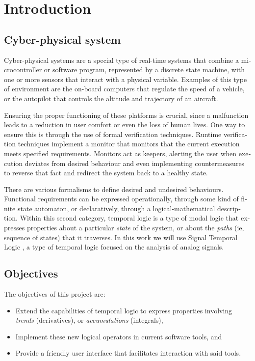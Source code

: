 \chapter{Introduction}
\begin{otherlanguage}{british}
\section{Cyber-physical system}
Cyber-physical systems are a special type of real-time systems that combine a microcontroller or software program, represented by a discrete state machine, with one or more sensors that interact with a physical variable. Examples of this type of environment are the on-board computers that regulate the speed of a vehicle, or the autopilot that controls the altitude and trajectory of an aircraft.

Ensuring the proper functioning of these platforms is crucial, since a malfunction leads to a reduction in user comfort or even the loss of human lives. One way to ensure this is through the use of formal verification techniques. Runtime verification techniques \cite{STTT_RV_21} implement a monitor that monitors that the current execution meets specified requirements. Monitors act as keepers, alerting the user when execution deviates from desired behaviour and even implementing countermeasures to reverse that fact and redirect the system back to a healthy state.

There are various formalisms to define desired and undesired behaviours. Functional requirements can be expressed operationally, through some kind of finite state automaton, or declaratively, through a logical-mathematical description. Within this second category, temporal logic is a type of modal logic that expresses properties about a particular \emph{state} of the system, or about the \emph{paths} (ie, sequence of states) that it traverses. In this work we will use Signal Temporal Logic \cite{STL}, a type of temporal logic focused on the analysis of analog signals.

\section{Objectives}

The objectives of this project are:

\begin{itemize}
\item Extend the capabilities of temporal logic to express properties involving \textit{trends} (derivatives), or \textit{accumulations} (integrals), 
\item Implement these new logical operators in current software tools, and
\item Provide a friendly user interface that facilitates interaction with said tools.
\end{itemize}



\end{otherlanguage}
